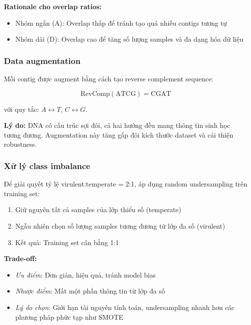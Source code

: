 \textbf{Rationale cho overlap ratios:}
\begin{itemize}
    \item Nhóm ngắn (A): Overlap thấp để tránh tạo quá nhiều contigs tương tự
    \item Nhóm dài (D): Overlap cao để tăng số lượng samples và đa dạng hóa dữ liệu
\end{itemize}

\subsubsection{Data augmentation}

Mỗi contig được augment bằng cách tạo reverse complement sequence:

\begin{equation}
\text{RevComp}(\text{ATCG}) = \text{CGAT}
\end{equation}

với quy tắc: $A \leftrightarrow T$, $C \leftrightarrow G$.

\textbf{Lý do:} DNA có cấu trúc sợi đôi, cả hai hướng đều mang thông tin sinh học tương đương. Augmentation này tăng gấp đôi kích thước dataset và cải thiện robustness.

\subsubsection{Xử lý class imbalance}

Để giải quyết tỷ lệ virulent:temperate = 2:1, áp dụng random undersampling trên training set:

\begin{enumerate}
    \item Giữ nguyên tất cả samples của lớp thiểu số (temperate)
    \item Ngẫu nhiên chọn số lượng samples tương đương từ lớp đa số (virulent)
    \item Kết quả: Training set cân bằng 1:1
\end{enumerate}

\textbf{Trade-off:}
\begin{itemize}
    \item \textit{Ưu điểm}: Đơn giản, hiệu quả, tránh model bias
    \item \textit{Nhược điểm}: Mất một phần thông tin từ lớp đa số
    \item \textit{Lý do chọn}: Giới hạn tài nguyên tính toán, undersampling nhanh hơn các phương pháp phức tạp như SMOTE
\end{itemize}

